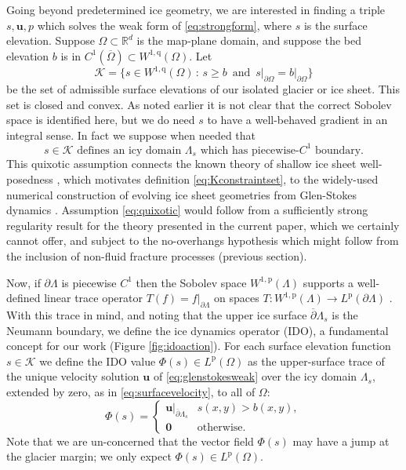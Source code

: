 \documentclass[letterpaper,final,12pt,reqno]{amsart}
\theoremstyle{claim}
\newcommand{\RR}{\mathbb{R}}
\newcommand{\bu}{\mathbf{u}}
\newcommand{\bzero}{\bm{0}}
\newcommand{\pp}{{\text{p}}}
\newcommand{\qq}{{\text{q}}}
\numberwithin{equation}{section}
\numberwithin{figure}{section}
\numberwithin{table}{section}
\numberwithin{theorem}{section}
\begin{document}
Going beyond predetermined ice geometry, we are interested in finding a triple $s,\bu,p$ which solves the weak form of \eqref{eq:strongform}, where $s$ is the surface elevation.  Suppose $\Omega \subset \RR^d$ is the map-plane domain, and suppose the bed elevation $b$ is in $C^1(\overline{\Omega}) \subset W^{1,\qq}(\Omega)$.  Let
\begin{equation}
\mathcal{K} = \{s \in W^{1,\qq}(\Omega) \,:\, s \ge b \, \text{ and } \, s\big|_{\partial\Omega} = b\big|_{\partial\Omega}\}  \label{eq:Kconstraintset}
\end{equation}
be the set of admissible surface elevations of our isolated glacier or ice sheet.  This set is closed and convex.  As noted earlier it is not clear that the correct Sobolev space is identified here, but we do need $s$ to have a well-behaved gradient in an integral sense.  In fact we suppose when needed that
\begin{equation}
s\in \mathcal{K} \text{ defines an icy domain } \Lambda_s \text{ which has piecewise-$C^1$ boundary.} \label{eq:quixotic}
\end{equation}
This quixotic assumption connects the known theory of shallow ice sheet well-posedness \cite{JouvetBueler2012}, which motivates definition \eqref{eq:Kconstraintset}, to the widely-used numerical construction of evolving ice sheet geometries from Glen-Stokes dynamics \cite{Jouvetetal2008,Lengetal2012}.  Assumption \eqref{eq:quixotic} would follow from a sufficiently strong regularity result for the theory presented in the current paper, which we certainly cannot offer, and subject to the no-overhangs hypothesis which might follow from the inclusion of non-fluid fracture processes (previous section).

Now, if $\partial \Lambda$ is piecewise $C^1$ then the Sobolev space $W^{1,\pp}(\Lambda)$ supports a well-defined linear trace operator $T(f) = f|_{\partial \Lambda}$ on spaces $T:W^{1,\pp}(\Lambda) \to L^\pp(\partial \Lambda)$ \cite[Section 5.5]{Evans2010}.  With this trace in mind, and noting that the upper ice surface $\overline{\partial} \Lambda_s$ is the Neumann boundary, we define the ice dynamics operator (IDO), a fundamental concept for our work (Figure \ref{fig:idoaction}).  For each surface elevation function $s \in \mathcal{K}$ we define the IDO value $\Phi(s) \in L^\pp(\Omega)$ as the upper-surface trace of the unique velocity solution $\bu$ of \eqref{eq:glenstokesweak} over the icy domain $\Lambda_s$, extended by zero, as in \eqref{eq:surfacevelocity}, to all of $\Omega$:
\begin{equation}
\Phi(s) = \begin{cases} \bu\big|_{\overline{\partial} \Lambda_s} & s(x,y) > b(x,y), \\
                        \bzero & \text{otherwise}. \end{cases} \label{eq:ido}
\end{equation}
Note that we are un-concerned that the vector field $\Phi(s)$ may have a jump at the glacier margin; we only expect $\Phi(s) \in L^\pp(\Omega)$.
\end{document}
